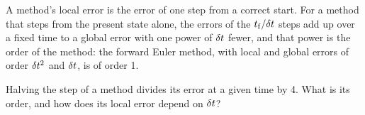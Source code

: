\begin{keyidea}
A method's local error is the error of one step from a correct start.
For a method that steps from the present state alone, the errors of the
$t_{\mathrm f}/\delta t$ steps add up over a fixed time to a global error with
one power of $\delta t$ fewer, and that power is the order of the method: the
forward Euler method, with local and global errors of order $\delta t^2$ and
$\delta t$, is of order 1.
\end{keyidea}

\begin{selfcheck}
Halving the step of a method divides its error at a given time by 4.
What is its order, and how does its local error depend on $\delta t$?
\end{selfcheck}
